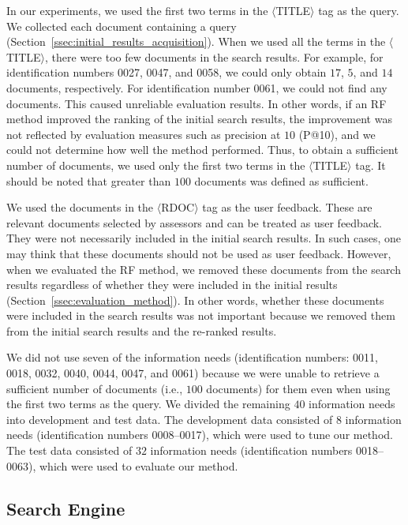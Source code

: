 \documentclass[english]{jnlp_1.4_rep}
\begin{document}
In our experiments, we used the first two terms in the
$\langle$TITLE$\rangle$ tag as the query. We collected each document
containing a query
(Section~\ref{ssec:initial_results_acquisition}). When we used all the
terms in the $\langle$TITLE$\rangle$, there were too few documents in
the search results. For example, for identification numbers 0027, 0047,
and 0058, we could only obtain $17$, $5$, and $14$ documents,
respectively. For identification number 0061, we could not find any
documents. This caused unreliable evaluation results. In other words, if
an RF method improved the ranking of the initial search results, the
improvement was not reflected by evaluation measures such as precision
at $10$ (P@10), and we could not determine how well the method
performed. Thus, to obtain a sufficient number of documents, we used
only the first two terms in the $\langle$TITLE$\rangle$ tag. It should
be noted that greater than $100$ documents was defined as sufficient.

We used the documents in the $\langle$RDOC$\rangle$ tag as the user
feedback. These are relevant documents selected by assessors and can be
treated as user feedback. They were not necessarily included in the
initial search results. In such cases, one may think that these
documents should not be used as user feedback. However, when we
evaluated the RF method, we removed these documents from the search
results regardless of whether they were included in the initial results
(Section~\ref{ssec:evaluation_method}). In other words, whether these
documents were included in the search results was not important because
we removed them from the initial search results and the re-ranked
results.

We did not use seven of the information needs (identification numbers:
0011, 0018, 0032, 0040, 0044, 0047, and 0061) because we were unable to
retrieve a sufficient number of documents (i.e., $100$ documents) for
them even when using the first two terms as the query. We divided the
remaining $40$ information needs into development and test data. The
development data consisted of $8$ information needs (identification
numbers 0008--0017), which were used to tune our method. The test data
consisted of $32$ information needs (identification numbers 0018--0063),
which were used to evaluate our method.


\subsection{Search Engine}
\end{document}
